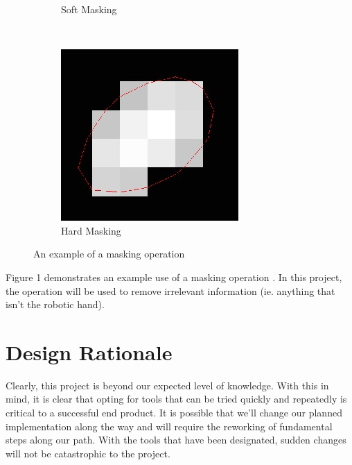 \documentclass[10pt,journal,compsoc, draftclsnofoot,onecolumn]{IEEEtran}
\begin{document}
\begin{figure}[h!]
\begin{subfigure}[b]{0.15\textwidth}
        \caption{Soft Masking}
    \end{subfigure}
    ~ %
    \begin{subfigure}[b]{0.15\textwidth}
        \includegraphics[width=\textwidth]{hard_masking.jpg}
        \caption{Hard Masking}
    \end{subfigure}
    \caption{An example of a masking operation}\label{fig:animals}
\end{figure}

\noindent
Figure 1 demonstrates an example use of a masking operation \cite{2:online}. In this project, the operation will be used to remove irrelevant information (ie. anything that isn't the robotic hand). 


\section{Design Rationale}
Clearly, this project is beyond our expected level of knowledge. With this in mind, it is clear that opting for tools that can be tried quickly and repeatedly is critical to a successful end product. It is possible that we'll change our planned implementation along the way and will require the reworking of fundamental steps along our path. With the tools that have been designated, sudden changes will not be catastrophic to the project.
\end{document}
